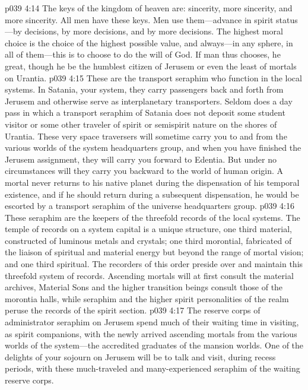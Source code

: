 \vs p039 4:14 The keys of the kingdom of heaven are: sincerity, more sincerity, and more sincerity. All men have these keys. Men use them---advance in spirit status---by decisions, by more decisions, and by more decisions. The highest moral choice is the choice of the highest possible value, and always---in any sphere, in all of them---this is to choose to do the will of God. If man thus chooses, he  great, though he be the humblest citizen of Jerusem or even the least of mortals on Urantia.
\pc \vs p039 4:15 \bibnobreakspace {} These are the transport seraphim who function in the local systems. In Satania, your system, they carry passengers back and forth from Jerusem and otherwise serve as interplanetary transporters. Seldom does a day pass in which a transport seraphim of Satania does not deposit some student visitor or some other traveler of spirit or semispirit nature on the shores of Urantia. These very space traversers will sometime carry you to and from the various worlds of the system headquarters group, and when you have finished the Jerusem assignment, they will carry you forward to Edentia. But under no circumstances will they carry you backward to the world of human origin. A mortal never returns to his native planet during the dispensation of his temporal existence, and if he should return during a subsequent dispensation, he would be escorted by a transport seraphim of the universe headquarters group.
\pc \vs p039 4:16 \bibnobreakspace {} These seraphim are the keepers of the threefold records of the local systems. The temple of records on a system capital is a unique structure, one third material, constructed of luminous metals and crystals; one third morontial, fabricated of the liaison of spiritual and material energy but beyond the range of mortal vision; and one third spiritual. The recorders of this order preside over and maintain this threefold system of records. Ascending mortals will at first consult the material archives, Material Sons and the higher transition beings consult those of the morontia halls, while seraphim and the higher spirit personalities of the realm peruse the records of the spirit section.
\pc \vs p039 4:17 \bibnobreakspace {} The reserve corps of administrator seraphim on Jerusem spend much of their waiting time in visiting, as spirit companions, with the newly arrived ascending mortals from the various worlds of the system---the accredited graduates of the mansion worlds. One of the delights of your sojourn on Jerusem will be to talk and visit, during recess periods, with these much\hyp{}traveled and many\hyp{}experienced seraphim of the waiting reserve corps.
